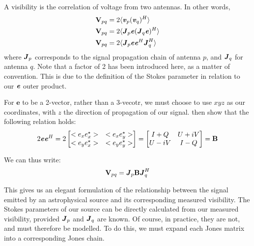\pg
A visibility is the correlation of voltage from two antennas. In other words,
\begin{align}
\textbf{V}_{pq} &= 2 \langle\textbf{\emph{v}}_p (\textbf{\emph{v}}_q)^H\rangle\\
\textbf{V}_{pq} &= 2 \langle\textbf{\emph{J}}_p \textbf{\emph{e}} (\textbf{\emph{J}}_q \textbf{\emph{e}})^H\rangle\\
\textbf{V}_{pq} &= 2 \langle\textbf{\emph{J}}_p \textbf{\emph{e}} \textbf{\emph{e}}^H \textbf{\emph{J}}_q^H\rangle
\end{align}
where $\textbf{\emph{J}}_p$ corresponds to the signal propagation chain of antenna $p$, and $\textbf{\emph{J}}_q$ for antenna $q$. Note that a factor of 2 has been introduced here, as a matter of convention. This is due to the definition of the Stokes parameter in relation to our $\textbf{\emph{e}}$ outer product.

\pg
For $\mathbf{e}$ to be a 2-vector, rather than a 3-vecotr, we must choose to use $xyz$ as our coordinates, with $z$ the direction of propagation of our signal.  then show that the following relation holds:
\begin{equation}
2 \textbf{\emph{e}} \textbf{\emph{e}}^H = 2  \begin{bmatrix} <e_x e_x^\star> & <e_x e_y^\star> \\ <e_y e_x^\star> & <e_y e_y^\star> \end{bmatrix} = \begin{bmatrix} I+Q & U+iV \\ U-iV & I-Q \end{bmatrix} = \textbf{B}
\end{equation}

\pg
We can thus write:
\begin{equation}
\textbf{V}_{pq} = \textbf{\emph{J}}_p \textbf{B} \textbf{\emph{J}}_q^H
\end{equation}

\pg
This gives us an elegant formulation of the relationship between the signal emitted by an astrophysical source and its corresponding measured visibility. The Stokes parameters of our source can be directly calculated from our measured visibility, provided $\textbf{\emph{J}}_p$ and $\textbf{\emph{J}}_q$ are known. Of course, in practice, they are not, and must therefore be modelled. To do this, we must expand each Jones matrix into a corresponding Jones chain.

